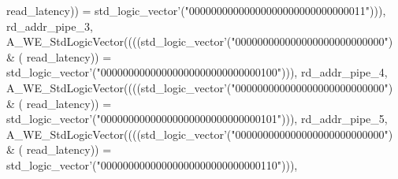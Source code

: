 \begin{DoxyCode}
{      read_latency}\textcolor{vhdlchar}{)}\textcolor{vhdlchar}{)} \textcolor{vhdlchar}{=} \textcolor{comment}{std\_logic\_vector}\textcolor{vhdlchar}{'}\textcolor{vhdlchar}{(}\textcolor{vhdllogic}{"00000000000000000000000000000011"}\textcolor{vhdlchar}{)}\textcolor{vhdlchar}{)}\textcolor{vhdlchar}{)}\textcolor{vhdlchar}{,} \textcolor{vhdlchar}{
      rd_addr_pipe_3}\textcolor{vhdlchar}{,} \textcolor{vhdlchar}{A\_WE\_StdLogicVector}\textcolor{vhdlchar}{(}\textcolor{vhdlchar}{(}\textcolor{vhdlchar}{(}\textcolor{vhdlchar}{(}\textcolor{comment}{std\_logic\_vector}\textcolor{vhdlchar}{'}\textcolor{vhdlchar}{(}\textcolor{vhdllogic}{"000000000000000000000000000"}\textcolor{vhdlchar}{)} \textcolor{vhdlchar}{&} \textcolor{vhdlchar}{(}\textcolor{vhdlchar}{
      read_latency}\textcolor{vhdlchar}{)}\textcolor{vhdlchar}{)} \textcolor{vhdlchar}{=} \textcolor{comment}{std\_logic\_vector}\textcolor{vhdlchar}{'}\textcolor{vhdlchar}{(}\textcolor{vhdllogic}{"00000000000000000000000000000100"}\textcolor{vhdlchar}{)}\textcolor{vhdlchar}{)}\textcolor{vhdlchar}{)}\textcolor{vhdlchar}{,} \textcolor{vhdlchar}{
      rd_addr_pipe_4}\textcolor{vhdlchar}{,} \textcolor{vhdlchar}{A\_WE\_StdLogicVector}\textcolor{vhdlchar}{(}\textcolor{vhdlchar}{(}\textcolor{vhdlchar}{(}\textcolor{vhdlchar}{(}\textcolor{comment}{std\_logic\_vector}\textcolor{vhdlchar}{'}\textcolor{vhdlchar}{(}\textcolor{vhdllogic}{"000000000000000000000000000"}\textcolor{vhdlchar}{)} \textcolor{vhdlchar}{&} \textcolor{vhdlchar}{(}\textcolor{vhdlchar}{
      read_latency}\textcolor{vhdlchar}{)}\textcolor{vhdlchar}{)} \textcolor{vhdlchar}{=} \textcolor{comment}{std\_logic\_vector}\textcolor{vhdlchar}{'}\textcolor{vhdlchar}{(}\textcolor{vhdllogic}{"00000000000000000000000000000101"}\textcolor{vhdlchar}{)}\textcolor{vhdlchar}{)}\textcolor{vhdlchar}{)}\textcolor{vhdlchar}{,} \textcolor{vhdlchar}{
      rd_addr_pipe_5}\textcolor{vhdlchar}{,} \textcolor{vhdlchar}{A\_WE\_StdLogicVector}\textcolor{vhdlchar}{(}\textcolor{vhdlchar}{(}\textcolor{vhdlchar}{(}\textcolor{vhdlchar}{(}\textcolor{comment}{std\_logic\_vector}\textcolor{vhdlchar}{'}\textcolor{vhdlchar}{(}\textcolor{vhdllogic}{"000000000000000000000000000"}\textcolor{vhdlchar}{)} \textcolor{vhdlchar}{&} \textcolor{vhdlchar}{(}\textcolor{vhdlchar}{
      read_latency}\textcolor{vhdlchar}{)}\textcolor{vhdlchar}{)} \textcolor{vhdlchar}{=} \textcolor{comment}{std\_logic\_vector}\textcolor{vhdlchar}{'}\textcolor{vhdlchar}{(}\textcolor{vhdllogic}{"00000000000000000000000000000110"}\textcolor{vhdlchar}{)}\textcolor{vhdlchar}{)}\textcolor{vhdlchar}{)}\textcolor{vhdlchar}{,} \textcolor{vhdlchar}{
}
\end{DoxyCode}
